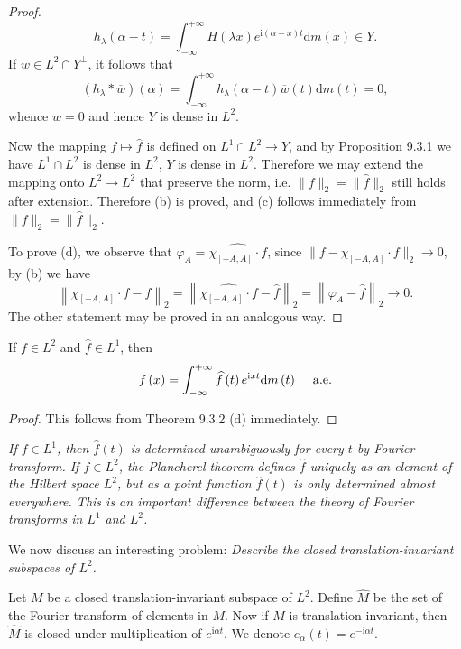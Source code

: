 \begin{proof}
$$
h_{\lambda}\left( \alpha -t \right) =\int_{-\infty}^{+\infty}{H\left( \lambda x \right) e^{\mathrm{i}\left( \alpha -x \right) t}\mathrm{d}m\left( x \right)}\in Y.
$$
If $w\in L^2\cap Y^\perp$, it follows that 
$$
\left( h_{\lambda}*\overline{w} \right) \left( \alpha \right) =\int_{-\infty}^{+\infty}{h_{\lambda}\left( \alpha -t \right) \overline{w}\left( t \right) \mathrm{d}m\left( t \right)}=0,
$$
whence $w=0$ and hence $Y$ is dense in $L^2$.\par
Now the mapping $f\mapsto\widehat{f}$ is defined on $L^1\cap L^2\to Y$, and by Proposition 9.3.1 we have $L^1\cap L^2$ is dense in $L^2$, $Y$ is dense in $L^2$. Therefore we may extend the mapping onto $L^2\to L^2$ that preserve the norm, i.e. $\|f\|_2=\|\widehat{f}\|_2$ still holds after extension. Therefore (b) is proved, and (c) follows immediately from $\|f\|_2=\|\widehat{f}\|_2$.\par
To prove (d), we observe that $\varphi_A=\widehat{\chi_{[-A,A]}\cdot f}$, since $\|f-\chi_{[-A,A]}\cdot f\|_2\to 0$, by (b) we have 
$$
\left\| \chi _{\left[ -A,A \right]}\cdot f-f \right\| _2=\left\| \widehat{\chi _{\left[ -A,A \right]}\cdot f}-\widehat{f} \right\| _2=\left\| \varphi _A-\widehat{f} \right\| _2\rightarrow 0.
$$
The other statement may be proved in an analogous way.
\end{proof}
\begin{theorem}
If $f\in L^2$ and $\widehat{f}\in L^1$, then 
$$
f\left( x \right) =\int_{-\infty}^{+\infty}{\widehat{f}\left( t \right) e^{\mathrm{i}xt}\mathrm{d}m\left( t \right)}\hspace{0.5cm}\mathrm{a}.\mathrm{e}.
$$
\end{theorem}
\begin{proof}
This follows from Theorem 9.3.2 (d) immediately.
\end{proof}
\begin{note}\em
If $f\in L^1$, then $\widehat{f}(t)$ is determined unambiguously for every $t$ by Fourier transform. If $f\in L^2$, the Plancherel theorem defines $\widehat{f}$ uniquely as an element of the Hilbert space $L^2$, but as a point function $\widehat{f}(t)$ is only determined almost everywhere. This is an important difference between the theory of Fourier transforms in $L^1$ and $L^2$.
\end{note}
We now discuss an interesting problem: \textit{Describe the closed translation-invariant subspaces of $L^2$.}\par
Let $M$ be a closed translation-invariant subspace of $L^2$. Define $\widehat{M}$ be the set of the Fourier transform of elements in $M$. Now if $M$ is translation-invariant, then $\widehat{M}$ is closed under multiplication of $e^{\mathrm{i}\alpha t}$. We denote $e_\alpha(t)=e^{-\mathrm{i}\alpha t}$.\par
